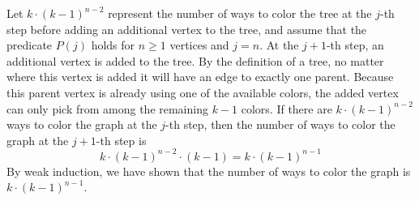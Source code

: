 \documentclass[12pt,letterpaper]{cos340hw}
\begin{document}
Let $k \cdot (k-1)^{n-2}$ represent the number of ways to color the tree at the $j$-th step before adding an additional 
vertex to the tree, and assume that the predicate $P(j)$ holds for $n \ge 1$ vertices and $j=n$. At the 
$j+1$-th step, an additional vertex is added to the tree. By the definition of a tree, no matter where this vertex is added it 
will have an edge to exactly one parent. Because this parent vertex is already using one of the available colors, 
the added vertex can only pick from among the remaining $k-1$ colors. If there are $k \cdot (k-1)^{n-2}$ ways to 
color the graph at the $j$-th step, then the number of ways to color the graph at the $j+1$-th step is
$$k \cdot (k-1)^{n-2} \cdot (k-1) = k \cdot (k-1)^{n-1}$$
By weak induction, we have shown that the number of ways to color the graph is $k \cdot (k-1)^{n-1}$.


\end{document}
